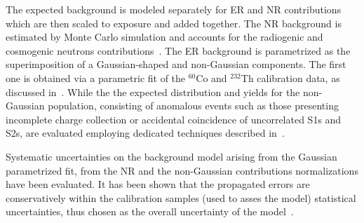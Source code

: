The expected background is modeled separately for ER and NR contributions which are then scaled to exposure and added together.
The NR background is estimated by Monte Carlo simulation and accounts for the radiogenic and cosmogenic neutrons
contributions~\cite{Aprile:2013tov}.
The ER background is parametrized as the superimposition of a Gaussian-shaped and non-Gaussian components.
The first one is obtained via a parametric fit of the $^{60}$Co and $^{232}$Th calibration data, as discussed in~\cite{xe100_run10_si}.
While the the expected distribution and yields for the non-Gaussian population, consisting of anomalous events such as those 
presenting incomplete charge collection or accidental coincidence of uncorrelated S1s and S2s,  
are evaluated employing dedicated techniques described in~\cite{xe100_run_combination}.

Systematic uncertainties on the background model arising from the Gaussian parametrized fit, from the NR and the non-Gaussian contributions normalizations
have been evaluated. It has been shown that the propagated errors are conservatively within the calibration samples (used to asses the model) statistical uncertainties, 
thus  chosen as the overall uncertainty of the model~\cite{xe100_run_combination}. 
